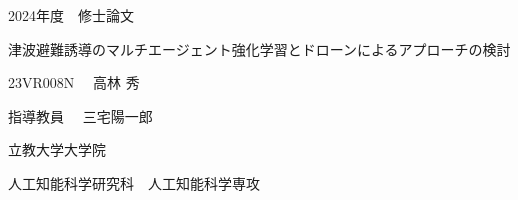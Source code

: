 \documentclass[a4paper, 12pt]{bxjsreport}
\begin{document}
\begin{titlepage}
    \begin{center}

        

        \vspace{50truept}


        



        {\headfont \Large 2024年度　修士論文}
        \vspace{20truept}

        {\headfont \Huge 津波避難誘導のマルチエージェント強化学習とドローンによるアプローチの検討}
        \vspace{160truept}
        
        {\headfont \Large 23VR008N　 \LARGE 高林 秀}\\ \vspace{10truept}
        
        \vspace{20truept}

        {\headfont \Large 指導教員　 三宅陽一郎}
        
        \vspace{100truept}

        {\headfont \Large 立教大学大学院}
        
        \vspace{10truept}
        
        {\headfont \Large 人工知能科学研究科　人工知能科学専攻}

    \end{center}
\end{titlepage}
\end{document}
